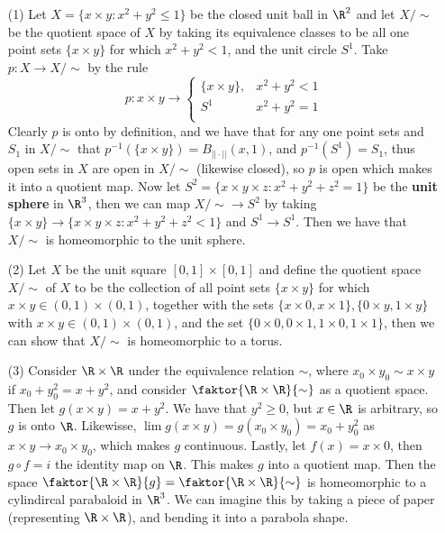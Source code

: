 \begin{example}
    \begin{enumerate}
        \item[(1)] Let $X=\{x \times y: x^2+y^2 \leq 1\}$ be the closed unit ball in $\R^2$ and let  $X/\sim$ be the
    quotient space of  $X$ by taking its equivalence classes to be all one point sets  $\{x \times
    y\}$ for which $x^2+y^2<1$, and the unit circle  $S^1$. Take  $p:X \rightarrow X/\sim$ by the
    rule
        \begin{equation*}
            p:x \times y \rightarrow \begin{cases}
                \{x \times y\}, & x^2+y^2<1 \\
                S^1        & x^2+y^2=1 \\
                      \end{cases}
        \end{equation*}
    Clearly $p$ is onto by definition, and we have that for any one point sets and  $ S_1$ in
    $X/\sim$ that  $p^{-1}(\{x \times y\})=B_{||\cdot||}(x,1)$, and $p^{-1}(S^1)=S_1$, thus open
    sets in $X$ are open in  $X/\sim$  (likewise closed), so $p$ is open which makes it into a
    quotient map. Now let  $S^2=\{x \times y \times z: x^2+y^2+z^2=1\}$ be the \textbf{unit sphere}
    in $\R^3$, then we can map  $X/\sim \rightarrow S^2$ by taking  $\{x \times y\} \rightarrow \{x
    \times y \times z: x^2+y^2+z^2<1\}$ and $ S^1 \rightarrow S^1$. Then we have that $X/\sim$ is
    homeomorphic to the unit sphere.

        \item[(2)] Let $X$ be the unit square  $[0,1] \times [0,1]$ and define the quotient space
            $X/\sim$ of $X$ to be the collection of all point sets $\{x \times y\}$ for which $x
            \times y \in (0,1) \times (0,1)$, together with the sets $\{x \times 0, x \times 1\},
            \{0 \times y, 1 \times y\}$ with $x \times y \in (0,1) \times (0,1)$, and the set $\{0
            \times 0, 0 \times 1, 1 \times 0, 1 \times 1\}$, then we can show that $X/\sim$ is
            homeomorphic to a torus.

        \item[(3)] Consider $\R \times \R$ under the equivalence relation
            $\sim$, where  $x_0 \times y_0 \sim x \times y$ if
            $x_0+y_0^2=x+y^2$, and consider $\faktor{\R \times \R}{\sim}$ as a
            quotient space. Then let $g(x \times y)=x+y^2$. We have that $y^2
            \geq 0$, but  $x \in \R$ is arbitrary, so  $g$ is onto  $\R$.
            Likewisse,  $\lim{g(x \times y)}=g(x_0 \times y_0)=x_0+y_0^2$ as
            $x \times y \rightarrow x_0 \times y_0$, which makes $g$ continuous.
            Lastly, let  $f(x)=x \times 0$, then $g \circ f=i$ the identity map
            on  $\R$. This makes $g$ into a quotient map. Then the space
            $\faktor{\R \times \R}{g}=\faktor{\R \times \R}{\sim}$ is
            homeomorphic to a cylindircal parabaloid in $\R^3$. We can imagine
            this by taking a piece of paper  (representing $\R \times \R$), and
            bending it into a parabola shape.


\end{enumerate}
\end{example}
